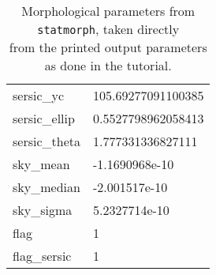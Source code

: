 \documentclass[10pt, preprint]{aastex}
\begin{document}
\begin{table}[H]
\begin{tabular}{ll}
        sersic\_yc & 105.69277091100385\\
        sersic\_ellip & 0.5527798962058413\\
        sersic\_theta & 1.777331336827111\\
        sky\_mean & -1.1690968e-10\\
        sky\_median & -2.001517e-10\\
        sky\_sigma & 5.2327714e-10\\
        flag & 1\\
        flag\_sersic & 1 \\\hline
    \end{tabular}
    \caption{\centering Morphological parameters from \texttt{statmorph}, taken directly \\ from the printed output parameters as done in the tutorial.}
    \label{tab:morphparam}
\end{table}
\end{document}
